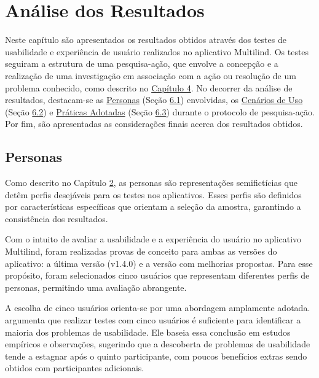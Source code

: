 \chapter[Análise dos Resultados]{Análise dos Resultados}
\label{chap:Análise dos Resultados}
Neste capítulo são apresentados os resultados obtidos através dos testes de usabilidade e experiência de usuário realizados no aplicativo Multilind. Os testes seguiram a estrutura de uma pesquisa-ação, que envolve a concepção e a realização de uma 
investigação em associação com a ação ou resolução de um problema conhecido, como descrito no \hyperref[sec:Metodologia de Analise de Resultados]{Capítulo 4}. No decorrer da análise de resultados, destacam-se as \hyperref[sec:Personas]{Personas} 
(Seção \hyperref[sec:Personas]{6.1}) envolvidas, os \hyperref[sec:Cenários de Uso]{Cenários de Uso} (Seção \hyperref[sec:Cenários de Uso]{6.2}) e \hyperref[sec:Práticas Adotadas]{Práticas Adotadas} (Seção \hyperref[sec:Práticas Adotadas]{6.3}) 
durante o protocolo de pesquisa-ação. Por fim, são apresentadas as considerações finais acerca dos resultados obtidos.

\section{Personas}
\label{sec:Personas}
Como descrito no Capítulo \hyperref[sec:Persona]{2}, as personas são representações semifictícias que detêm perfis desejáveis para os testes nos aplicativos. Esses perfis são definidos por características específicas que orientam a seleção da amostra, 
garantindo a consistência dos resultados. 

Com o intuito de avaliar a usabilidade e a experiência do usuário no aplicativo Multilind, foram realizadas provas de conceito para ambas as versões do aplicativo: a última versão (v1.4.0) e a versão com melhorias propostas. Para esse propósito, 
foram selecionados cinco usuários que representam diferentes perfis de personas, permitindo uma avaliação abrangente.

A escolha de cinco usuários orienta-se por uma abordagem amplamente adotada.  argumenta que realizar testes com cinco usuários é suficiente para identificar a maioria dos problemas de 
usabilidade. Ele baseia essa conclusão em estudos empíricos e observações, sugerindo que a descoberta de problemas de usabilidade tende a estagnar após o quinto participante, com poucos benefícios 
extras sendo obtidos com participantes adicionais.

